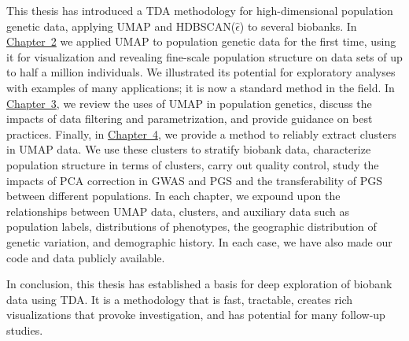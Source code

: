 This thesis has introduced a TDA methodology for high-dimensional population genetic data, applying UMAP and HDBSCAN($\hat{\epsilon}$) to several biobanks. In \hyperref[chap:chapter2]{Chapter~2} we applied UMAP to population genetic data for the first time, using it for visualization and revealing fine-scale population structure on data sets of up to half a million individuals. We illustrated its potential for exploratory analyses with examples of many applications; it is now a standard method in the field. In \hyperref[chap:chapter3]{Chapter~3}, we review the uses of UMAP in population genetics, discuss the impacts of data filtering and parametrization, and provide guidance on best practices. Finally, in \hyperref[chap:chapter4]{Chapter~4}, we provide a method to reliably extract clusters in UMAP data. We use these clusters to stratify biobank data, characterize population structure in terms of clusters, carry out quality control, study the impacts of PCA correction in GWAS and PGS and the transferability of PGS between different populations. In each chapter, we expound upon the relationships between UMAP data, clusters, and auxiliary data such as population labels, distributions of phenotypes, the geographic distribution of genetic variation, and demographic history. In each case, we have also made our code and data publicly available. 

In conclusion, this thesis has established a basis for deep exploration of biobank data using TDA. It is a methodology that is fast, tractable, creates rich visualizations that provoke investigation, and has potential for many follow-up studies.

